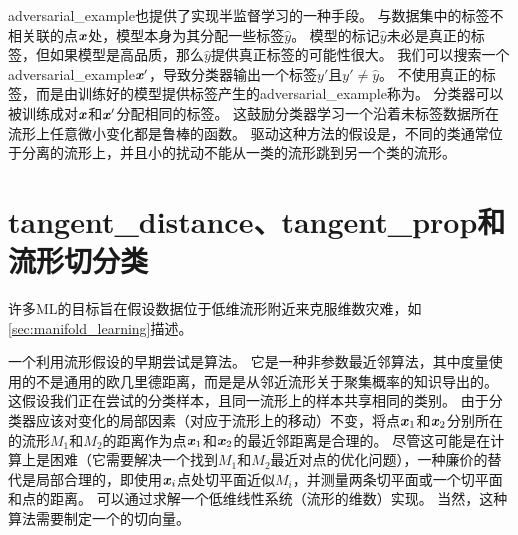 \gls{adversarial_example}也提供了实现半监督学习的一种手段。
与数据集中的标签不相关联的点$\boldsymbol{\mathit{x}}$处，模型本身为其分配一些标签$\hat y$。
模型的标记$\hat y$未必是真正的标签，但如果模型是高品质，那么$\hat y$提供真正标签的可能性很大。
我们可以搜索一个\gls{adversarial_example}$\boldsymbol{\mathit{x}}'$，导致分类器输出一个标签$y'$且$y' \neq \hat y$。
不使用真正的标签，而是由训练好的模型提供标签产生的\gls{adversarial_example}称为\citep{miyato2015distributional}。
分类器可以被训练成对$\boldsymbol{\mathit{x}}$和$\boldsymbol{\mathit{x}}'$分配相同的标签。
这鼓励分类器学习一个沿着未标签数据所在流形上任意微小变化都是鲁棒的函数。
驱动这种方法的假设是，不同的类通常位于分离的流形上，并且小的扰动不能从一类的流形跳到另一个类的流形。


\section{\gls{tangent_distance}、\gls{tangent_prop}和流形切分类}
\label{sec:tangent_distance_tangent_prop_and_manifold_tangent_classifier}
许多\gls{ML}的目标旨在假设数据位于低维流形附近来克服维数灾难，如\ref{sec:manifold_learning}描述。

一个利用流形假设的早期尝试是算法\citep{Simard93-small,Simard98}。
它是一种非参数最近邻算法，其中度量使用的不是通用的欧几里德距离，而是是从邻近流形关于聚集概率的知识导出的。
这假设我们正在尝试的分类样本，且同一流形上的样本共享相同的类别。
由于分类器应该对变化的局部因素（对应于流形上的移动）不变，将点$\boldsymbol{\mathit{x}}_1$和$\boldsymbol{\mathit{x}}_2$分别所在的流形$M_1$和$M_2$的距离作为点$\boldsymbol{\mathit{x}}_1$和$\boldsymbol{\mathit{x}}_2$的最近邻距离是合理的。
尽管这可能是在计算上是困难（它需要解决一个找到$M_1$和$M_2$最近对点的优化问题），一种廉价的替代是局部合理的，即使用$\boldsymbol{\mathit{x}}_i$点处切平面近似$M_i$，并测量两条切平面或一个切平面和点的距离。
可以通过求解一个低维线性系统（流形的维数）实现。
当然，这种算法需要制定一个的切向量。

